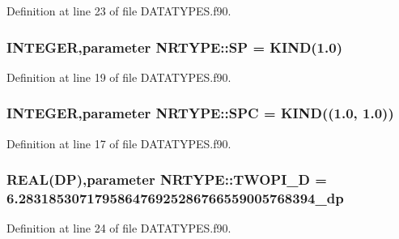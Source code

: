Definition at line 23 of file DATATYPES.f90.

\hypertarget{namespaceNRTYPE_a0e27dcc6c8b8c3b676b0ebdeda77f849}{
\subsubsection[{SP}]{\setlength{\rightskip}{0pt plus 5cm}INTEGER,parameter {\bf NRTYPE::SP} = KIND(1.0)}}
\label{namespaceNRTYPE_a0e27dcc6c8b8c3b676b0ebdeda77f849}


Definition at line 19 of file DATATYPES.f90.

\hypertarget{namespaceNRTYPE_a203d15b0d754eb809bb2d9689c0f4a20}{
\subsubsection[{SPC}]{\setlength{\rightskip}{0pt plus 5cm}INTEGER,parameter {\bf NRTYPE::SPC} = KIND((1.0, 1.0))}}
\label{namespaceNRTYPE_a203d15b0d754eb809bb2d9689c0f4a20}


Definition at line 17 of file DATATYPES.f90.

\hypertarget{namespaceNRTYPE_a39b7abf71e8b2487187ea1b1f3a2dedf}{
\subsubsection[{TWOPI\_\-D}]{\setlength{\rightskip}{0pt plus 5cm}REAL({\bf DP}),parameter {\bf NRTYPE::TWOPI\_\-D} = 6.283185307179586476925286766559005768394\_\-dp}}
\label{namespaceNRTYPE_a39b7abf71e8b2487187ea1b1f3a2dedf}


Definition at line 24 of file DATATYPES.f90.

